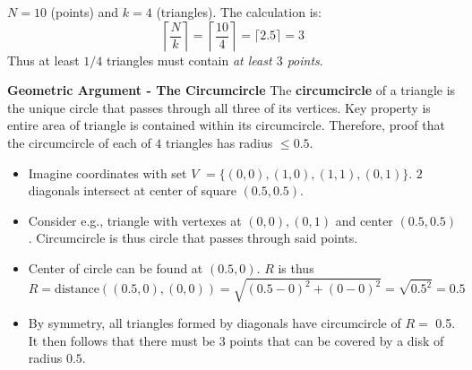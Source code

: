 \documentclass[../Main.tex]{subfiles}
\begin{document}
{\begin{itemize}
     $N=10$ (points) and $k=4$ (triangles). The calculation is:
\[
\left\lceil \frac{N}{k} \right\rceil = \left\lceil \frac{10}{4} \right\rceil = \lceil 2.5 \rceil = 3
\]
Thus at least $1/4$ triangles must contain \textit{at least $3$ points}.
\end{itemize}

\textbf{Geometric Argument - The Circumcircle}
The \textbf{circumcircle} of a triangle is the unique circle that passes through all three of its vertices. Key property is entire area of triangle is contained within its circumcircle. Therefore, proof that the circumcircle of each of $4$ triangles has radius $\leq 0.5$.
\begin{itemize}
    \item Imagine coordinates with set $V$ $=\{(0,0), (1,0), (1,1), (0,1)\}$. $2$ diagonals intersect at center of square $(0.5, 0.5)$.
    \item Consider e.g., triangle with vertexes at $(0,0), (0,1)$ and center $(0.5, 0.5)$. Circumcircle is thus circle that passes through said points.
    \item Center of circle can be found at $(0.5, 0)$. $R$ is thus 
    \[
        R = \text{distance}((0.5,0), (0,0)) = \sqrt{(0.5-0)^2 + (0-0)^2} = \sqrt{0.5^2} = 0.5
    \]
    \item By symmetry, all triangles formed by diagonals have circumcircle of $R=$ 0.5. It then follows that there must be $3$ points that can be covered by a disk of radius $0.5$.
\end{itemize}
}

\end{document}
